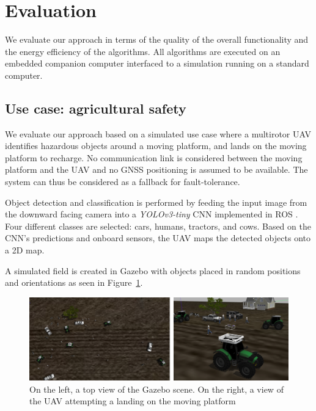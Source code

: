 \documentclass[conference]{IEEEtran}
\begin{document}
\section{Evaluation}
\label{sec:experimental}

We evaluate our approach in terms of the quality of the overall
functionality and the energy efficiency of the algorithms. All
algorithms are executed on an embedded companion computer interfaced
to a simulation running on a standard computer.

\subsection{Use case: agricultural safety}

We evaluate our approach based on a simulated use case where %
a multirotor UAV identifies
hazardous objects around a moving platform, and lands on the
moving platform to recharge.
%
%
No communication link is considered between the moving platform and the UAV
and no GNSS positioning is assumed to be available. The system can thus be
considered as a fallback for fault-tolerance.


Object detection and classification is performed by feeding the input
image from the downward facing camera into a \emph{YOLOv3-tiny} CNN
\cite{yolov3} implemented in ROS \cite{bjelonicYolo2018}. Four
different classes are selected: cars, humans, tractors, and
cows. Based on the CNN's predictions and onboard
sensors, the UAV maps the detected objects onto a 2D map.
 

A simulated field is created in Gazebo with objects placed in random
positions and orientations as seen in Figure~\ref{fig:Gazebo}.

\begin{figure}[t]
\centering
\includegraphics[scale=0.2]{gazebo_scalled.png}
\caption{On the left, a top view of the Gazebo scene. On the right, a view of the UAV attempting a landing on the moving platform }
\label{fig:Gazebo}
\end{figure}
\end{document}
